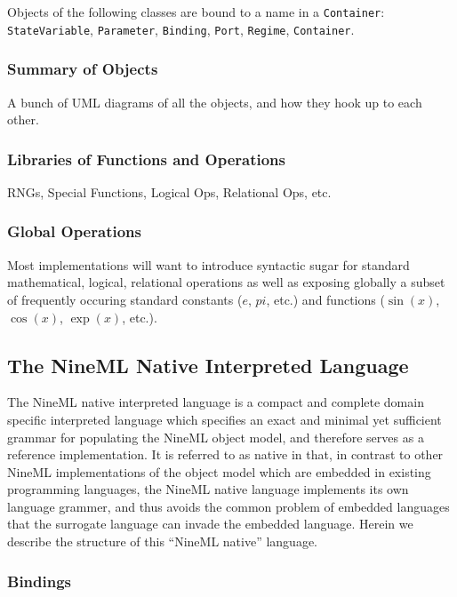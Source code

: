 \documentclass[a4paper]{article}
\newcommand\nmlClass[1]{{\tt #1}}
\begin{document}
Objects of the following classes are bound to a name in a \nmlClass{Container}:
\nmlClass{StateVariable}, \nmlClass{Parameter}, \nmlClass{Binding},
\nmlClass{Port}, \nmlClass{Regime}, \nmlClass{Container}.

\subsubsection{Summary of Objects}

A bunch of UML diagrams of all the objects, and how they hook up to each other.

\subsubsection{\label{nml_lib}Libraries of Functions and Operations}

RNGs, Special Functions, Logical Ops, Relational Ops, etc.

\subsubsection{Global Operations}

Most implementations will want to introduce syntactic sugar for
standard mathematical, logical, relational operations as well as
exposing globally a subset of frequently occuring standard constants
($e$, $pi$, etc.) and functions ($\sin(x)$, $\cos(x)$, $\exp(x)$,
etc.).


\subsection{The NineML Native Interpreted Language}

The NineML native interpreted language is a compact and complete
domain specific interpreted language which specifies an exact and
minimal yet sufficient grammar for populating the NineML object model,
and therefore serves as a reference implementation.  It is referred to
as native in that, in contrast to other NineML implementations of
the object model which are embedded in existing programming languages,
the NineML native language implements its own language grammer, and
thus avoids the common problem of embedded languages that the
surrogate language can invade the embedded language.  Herein we
describe the structure of this ``NineML native'' language.

\subsubsection{Bindings}
\end{document}
